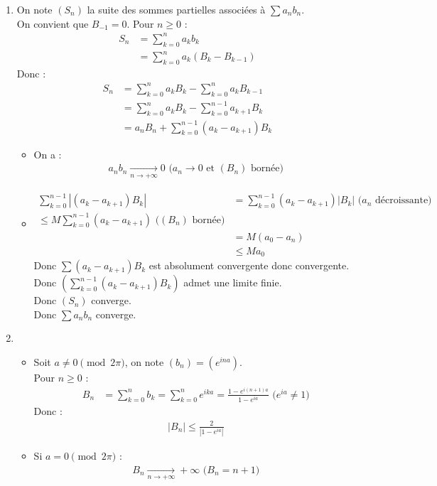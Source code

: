 \documentclass[../main.tex]{subfiles}
\begin{document}
\begin{enumerate}
    \item On note $(S_n)$ la suite des sommes partielles associées à $\sum a_n b_n$. \\
    On convient que $B_{-1} = 0$. Pour $n\geq 0$ : 
    \begin{align*}
        S_n &= \sum_{k=0}^{n} a_k b_k \\
        &= \sum_{k=0}^{n} a_k (B_k - B_{k-1})
    \end{align*}
    Donc : 
    \begin{align*}
        S_n &= \sum_{k=0}^{n} a_k B_k - \sum_{k=0}^{n} a_k B_{k-1} \\
        &= \sum_{k=0}^{n} a_k B_k - \sum_{k=0}^{n-1} a_{k+1} B_k \\ 
        &= a_n B_n + \sum_{k=0}^{n-1} (a_k - a_{k+1}) B_k
    \end{align*}
    \begin{itemize}
        \item On a : 
        \begin{align*}
            a_n b_n \underset{n \to +\infty}{\longrightarrow} 0 \text{ ($a_n \to 0$ et $(B_n)$ bornée)}
        \end{align*}
        \item \begin{align*}
            \sum_{k=0}^{n-1} |(a_k - a_{k+1}) B_k| &= \sum_{k=0}^{n-1} (a_k - a_{k+1}) |B_k| \text{ ($a_n$ décroissante)} \\
            \leq M \sum_{k=0}^{n-1} (a_k - a_{k+1}) \text{ ($(B_n)$ bornée)} \\
            &= M (a_0 - a_n) \\
            &\leq M a_0
        \end{align*}
        Donc $\sum (a_k - a_{k+1}) B_k$ est absolument convergente donc convergente. \\
        Donc $(\sum_{k=0}^{n-1} (a_k - a_{k+1}) B_k)$ admet une limite finie. \\
        Donc $(S_n)$ converge. \\
        Donc $\sum a_n b_n$ converge.
    \end{itemize}

    \item \begin{itemize}
        \item Soit $a\neq 0 \pmod{2\pi}$, on note $(b_n) = (e^{ina})$. \\
        Pour $n\geq 0$ : 
        \begin{align*}
            B_n &= \sum_{k=0}^{n} b_k = \sum_{k=0}^{n} e^{ika} = \frac{1 - e^{i(n+1)a}}{1 - e^{ia}} \text{ ($e^{ia} \neq 1$)}
        \end{align*}
        Donc : 
        \begin{align*}
            |B_n| \leq \frac{2}{|1 - e^{ia}|}
        \end{align*}

        \item Si $a = 0 \pmod{2\pi}$ : 
        \begin{align*}
            B_n \underset{n \to +\infty}{\longrightarrow} +\infty \text{ ($B_n = n+1$)}
        \end{align*}
    \end{itemize}
\end{enumerate}
\end{document}
